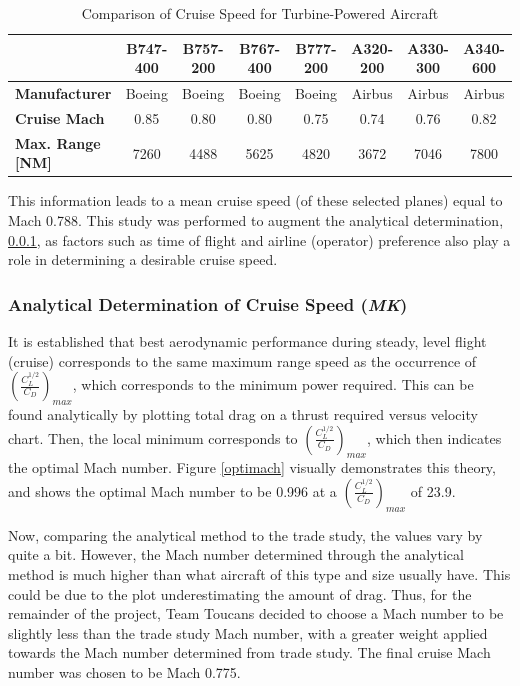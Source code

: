 \begin{table}[!h]
    \centering
        \caption{Comparison of Cruise Speed for Turbine-Powered Aircraft}
    \begin{tabular}{|p{1.1in}||c|c|c|c|c|c|c|}\toprule
         & \textbf{B747-400} & \textbf{B757-200} & \textbf{B767-400} & \textbf{B777-200} & \textbf{A320-200} & \textbf{A330-300} & \textbf{A340-600} \\\hline \hline
         \textbf{Manufacturer} & Boeing & Boeing & Boeing & Boeing & Airbus & Airbus & Airbus\\ \hline
         \textbf{Cruise Mach} & 0.85 & 0.80 & 0.80 & 0.75 & 0.74 & 0.76 & 0.82\\ \hline
         \textbf{Max. Range [NM]} & 7260 & 4488 & 5625 & 4820 & 3672 & 7046 & 7800 \\ \bottomrule
    \end{tabular}
    \label{tab:cruisecomp}
\end{table}

\newpage
This information leads to a mean cruise speed (of these selected planes) equal to Mach 0.788.  This study was performed to augment the analytical determination, \ref{cruisespeed}, as factors such as time of flight and airline (operator) preference also play a role in determining a desirable cruise speed.

\subsubsection{Analytical Determination of Cruise Speed (\textit{MK})} \label{cruisespeed}
It is established that best aerodynamic performance during steady, level flight (cruise) corresponds to the same maximum range speed as the occurrence of $(\frac{C_{L}^{1/2}}{C_{D}})_{max}$, which corresponds to the minimum power required. This can be found analytically by plotting total drag on a thrust required versus velocity chart. Then, the local minimum corresponds to $(\frac{C_{L}^{1/2}}{C_{D}})_{max}$, which then indicates the optimal Mach number. Figure \ref{optimach} visually demonstrates this theory, and shows the optimal Mach number to be 0.996 at a $(\frac{C_{L}^{1/2}}{C_{D}})_{max}$ of 23.9. 

Now, comparing the analytical method to the trade study, the values vary by quite a bit. However, the Mach number determined through the analytical method is much higher than what aircraft of this type and size usually have. This could be due to the plot underestimating the amount of drag. Thus, for the remainder of the project, Team Toucans decided to choose a Mach number to be slightly less than the trade study Mach number, with a greater weight applied towards the Mach number determined from trade study. The final cruise Mach number was chosen to be Mach 0.775.

